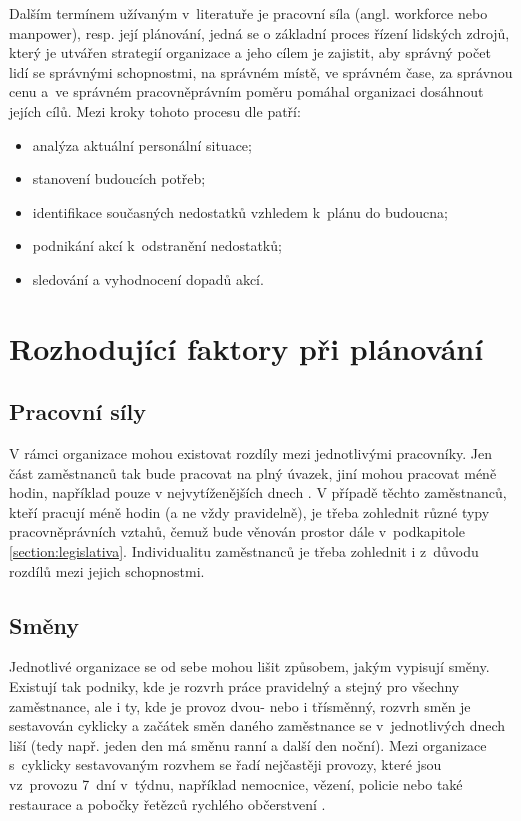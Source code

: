 \documentclass[twoside]{ctuthesis}
\begin{document}
Dalším termínem užívaným v~literatuře je pracovní síla (angl. workforce nebo manpower), resp. její plánování, jedná se o základní proces řízení lidských zdrojů, který je utvářen strategií organizace a jeho cílem je zajistit, aby správný počet lidí se správnými schopnostmi, na správném místě, ve správném čase, za správnou cenu a~ve správném pracovněprávním poměru pomáhal organizaci dosáhnout jejích cílů. Mezi kroky tohoto procesu dle \cite{cipd2020workforce} patří:
\begin{itemize}
	\item analýza aktuální personální situace;
	\item stanovení budoucích potřeb;
	\item identifikace současných nedostatků vzhledem k~plánu do budoucna;
	\item podnikání akcí k~odstranění nedostatků;
	\item sledování a vyhodnocení dopadů akcí.
\end{itemize}

\section{Rozhodující faktory při plánování}

\subsection{Pracovní síly}
V rámci organizace mohou existovat rozdíly mezi jednotlivými pracovníky. Jen část zaměstnanců tak bude pracovat na plný úvazek, jiní mohou pracovat méně hodin, například pouze v nejvytíženějších dnech \cite{lin2015}. V případě těchto zaměstnanců, kteří pracují méně hodin (a ne vždy pravidelně), je třeba zohlednit různé typy pracovněprávních vztahů, čemuž bude věnován prostor dále v~podkapitole \ref{section:legislativa}. Individualitu zaměstnanců je třeba zohlednit i z~důvodu rozdílů mezi jejich schopnostmi.

\subsection{Směny}
\label{sub:smeny}
Jednotlivé organizace se od sebe mohou lišit způsobem, jakým vypisují směny. Existují tak podniky, kde je rozvrh práce pravidelný a stejný pro všechny zaměstnance, ale i ty, kde je provoz dvou- nebo i třísměnný, rozvrh směn je sestavován cyklicky a začátek směn daného zaměstnance se v~jed\-not\-li\-vý\-ch dnech liší (tedy např. jeden den má směnu ranní a další den noční). Mezi organizace s~cyklicky sestavovaným rozvhem se řadí nejčastěji provozy, které jsou vz~provozu 7~dní v~týdnu, například nemocnice, vězení, policie nebo také restaurace a pobočky řetězců rychlého občerstvení \cite{bechtold1981work}.
\end{document}
